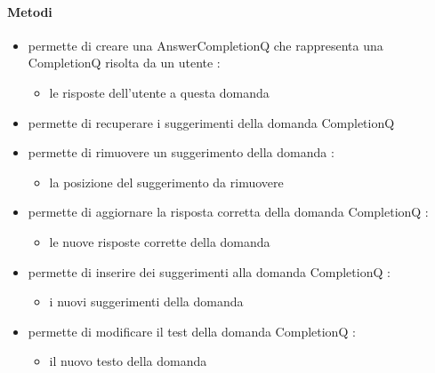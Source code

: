 \paragraph{Metodi}
\begin{itemize}
\item {}
\newline
permette di creare una AnswerCompletionQ che rappresenta una CompletionQ risolta da un utente
\newline
{} :
\begin{itemize}
\item {}
\newline
le risposte dell'utente a questa domanda
\end{itemize}
\item {}
\newline
permette di recuperare i suggerimenti della domanda CompletionQ
\newline
\item {}
\newline
permette di rimuovere un suggerimento della domanda
\newline
{} :
\begin{itemize}
\item {}
\newline
la posizione del suggerimento da rimuovere
\end{itemize}
\item {}
\newline
permette di aggiornare la risposta corretta della domanda CompletionQ
\newline
{} :
\begin{itemize}
\item {}
\newline
le nuove risposte corrette della domanda
\end{itemize}
\item {}
\newline
permette di inserire dei suggerimenti alla domanda CompletionQ
\newline
{} :
\begin{itemize}
\item {}
\newline
i nuovi suggerimenti della domanda
\end{itemize}
\item {}
\newline
permette di modificare il test della domanda CompletionQ
\newline
{} :
\begin{itemize}
\item {}
\newline
il nuovo testo della domanda
\end{itemize}
\end{itemize}
